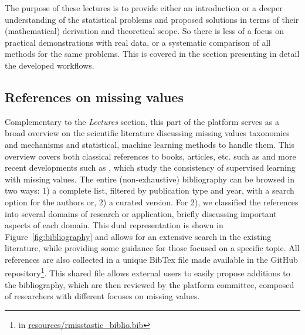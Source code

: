 The purpose of these lectures is to provide either an introduction or a deeper understanding of the statistical problems and proposed solutions in terms of their (mathematical) derivation and theoretical scope. So there is less of a focus on practical demonstrations with real data, or a systematic comparison of all methods for the same problems. This is covered in the section presenting in detail the developed workflows.



\subsection{References on missing values}\label{sec:biblio}

Complementary to the \textit{Lectures} section, this part of the platform serves as a
broad overview on the scientific literature discussing missing values taxonomies
and mechanisms and statistical, machine learning methods to handle them. This overview covers both
classical references to books, articles, etc. such as \citet{Schafer2002,VanBuuren2012, Carpenter2012,little2019statistical} and more recent developments such as
\citet{josse_etal_2019, gondara_wang_2018}, which study the consistency of supervised learning with missing values. The entire (non-exhaustive)
bibliography can be browsed in two ways: 1) a complete list,
filtered by publication type and year, with a search option for the authors or, 2) a curated version. For 2), we classified the references into
several domains of research or application, briefly discussing important
aspects of each domain. This dual representation is shown in
Figure~\ref{fig:bibliography} and allows for an extensive search in the existing
literature, while providing some guidance for those focused on a specific
topic. All references are also collected in a unique BibTex file made available
in the GitHub repository\footnote{in \url{resources/rmisstastic_biblio.bib}}. This shared file allows external users to easily propose additions to the bibliography, which are then reviewed by the platform committee, composed of researchers with different focuses on  missing values.


